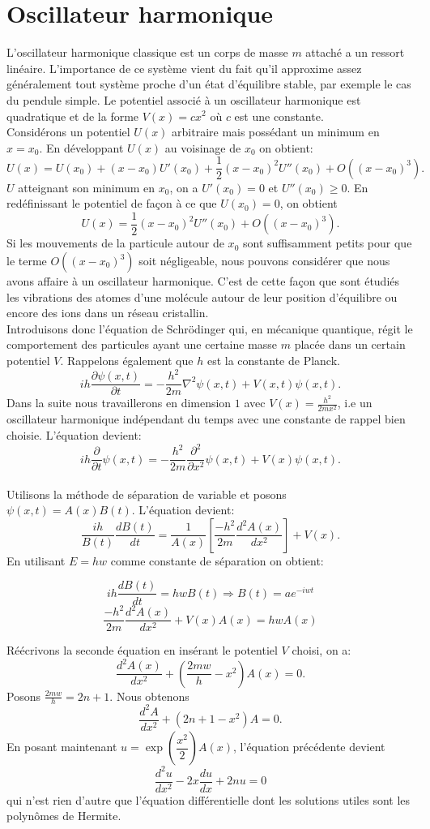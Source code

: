 \section{Oscillateur harmonique}
L'oscillateur harmonique classique est un corps de masse $m$ attaché a un ressort linéaire. L'importance de ce système vient du fait qu'il approxime assez généralement tout système proche d'un état d'équilibre stable, par exemple le cas du pendule simple. Le potentiel associé à un oscillateur harmonique est quadratique et de la forme $V(x)=cx^2$ où $c$ est une constante.
\\Considérons un potentiel $U(x)$ arbitraire mais possédant un minimum en $x=x_0$. En développant $U(x)$ au voisinage de $x_0$ on obtient: $$U(x)=U(x_0)+(x-x_0)U'(x_0)+\frac{1}{2}(x-x_0)^2U''(x_0)+O((x-x_0)^3).$$
$U$ atteignant son minimum en $x_0$, on a $U'(x_0)=0$ et $U''(x_0)\geqslant 0$. En redéfinissant le potentiel de façon à ce que $U(x_0)=0$, on obtient $$U(x)=\frac{1}{2}(x-x_0)^2U''(x_0)+O((x-x_0)^3).$$
Si les mouvements de la particule autour de $x_0$ sont suffisamment petits pour que le terme $O((x-x_0)^3)$ soit négligeable, nous pouvons considérer que nous avons affaire à un oscillateur harmonique. C'est de cette façon que sont étudiés les vibrations des atomes d'une molécule autour de leur position d'équilibre ou encore des ions dans un réseau cristallin.
\\Introduisons donc l'équation de Schrödinger qui, en mécanique quantique, régit le comportement des particules ayant une certaine masse $m$ placée dans un certain potentiel $V$. Rappelons également que $h$ est la constante de Planck.
$$ih\frac{\partial\psi(x,t)}{\partial t}= -\frac{h^2}{2m} \nabla^2 \psi(x,t)+V(x,t)\psi(x,t).$$
Dans la suite nous travaillerons en dimension $1$ avec $\displaystyle{V(x)=\frac{h^2}{2mx^2}}$, i.e un oscillateur harmonique indépendant du temps avec une constante de rappel bien choisie. L'équation devient: $$ih\frac{\partial}{\partial t} \psi(x,t)= -\frac{h^2}{2m}\frac{\partial^2}{\partial x^2} \psi(x,t)+V(x)\psi(x,t).$$
\\Utilisons la méthode de séparation de variable et posons $\psi(x,t)=A(x)B(t)$. L'équation devient:
$$\frac{ih}{B(t)}\frac{dB(t)}{dt}=\frac{1}{A(x)}\left[ \frac{-h^2}{2m} \frac{d^2 A(x)}{dx^2}\right]+V(x).$$
En utilisant $E=hw$ comme constante de séparation on obtient:

$$ih\frac{dB(t)}{dt} = hwB(t) \Longrightarrow B(t)=ae^{-iwt}$$
$$\frac{-h^2}{2m}\frac{d^2A(x)}{dx^2}+V(x)A(x)= hwA(x)$$

Réécrivons la seconde équation en insérant le potentiel $V$ choisi, on a: $$\frac{d^2A(x)}{dx^2}+\left(\frac{2mw}{h}-x^2\right) A(x)=0.$$ Posons $\frac{2mw}{h}=2n+1$. Nous obtenons $$\frac{d^2A}{dx^2}+(2n+1-x^2)A=0.$$
En posant maintenant $u=\exp\left(\dfrac{x^2}{2}\right)A(x)$, l'équation précédente devient 
$$\frac{d^2u}{dx^2}-2x\frac{du}{dx}+2nu=0$$
qui n'est rien d'autre que l'équation différentielle dont les solutions utiles sont les polynômes de Hermite.